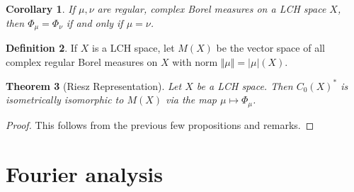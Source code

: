\documentclass[11pt]{amsart}
\newtheorem{theorem}{Theorem}[section]
\newtheorem{corollary}[theorem]{Corollary}
\theoremstyle{definition}
\newtheorem{definition}[theorem]{Definition}
\numberwithin{equation}{section}
\begin{document}
\begin{corollary}
    If $\mu,\nu$ are regular, complex Borel measures on a LCH space $X$, then $\Phi_\mu=\Phi_\nu$ if and only if $\mu=\nu$.
\end{corollary}
\begin{definition}
    If $X$ is a LCH space, let $M(X)$ be the vector space of all complex regular Borel measures on $X$ with norm $\Vert\mu\Vert=|\mu|(X)$.
\end{definition}
\begin{theorem}[Riesz Representation]
    Let $X$ be a LCH space. Then $C_0(X)^*$ is isometrically isomorphic to $M(X)$ via the map $\mu\mapsto \Phi_\mu$.
\end{theorem}
\begin{proof}
    This follows from the previous few propositions and remarks.
\end{proof}
\newpage
\section{Fourier analysis}
\end{document}
